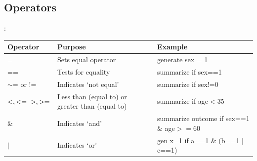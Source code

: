 \subsection{Operators}
\begin{frame}[fragile]{\secname : \subsecname}
\small
\renewcommand{\arraystretch}{1.25}
\begin{tabulary}{\textwidth}{LLL}
    \toprule
    \textbf{Operator} & \textbf{Purpose} & \textbf{Example} \\
    \midrule
    =  & Sets equal operator & generate sex = 1 \\
    == & Tests for equality & summarize if sex==1 \\
    $\sim$= or != & Indicates `not equal' & summarize if sex!=0 \\
    $< , <= \newline > , >=$ & Less than (equal to) or greater than (equal to) & summarize if age$<$35 \\
    \& & Indicates `and' & summarize outcome if sex==1 \& age$>=$60 \\
    $ \mid $ & Indicates `or' & gen x=1 if a==1 \& \newline (b==1 $\mid$ c==1) \\
\end{tabulary}
\end{frame}



